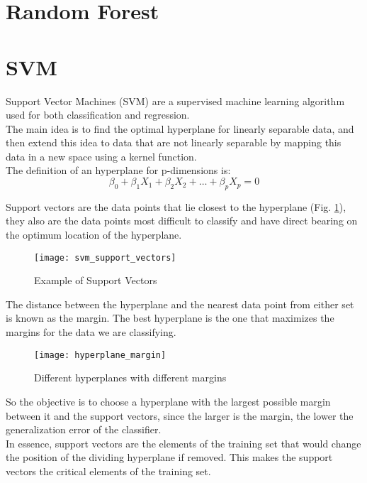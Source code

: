 \pagebreak

\section{Random Forest}

\section{SVM} \label{svm}
Support Vector Machines (SVM) are a supervised machine learning algorithm used for both classification and regression. \\
The main idea is to find the optimal hyperplane for linearly separable data, and then extend this idea to data that are not linearly separable by mapping this data in a new space using a kernel function.\\
The definition of an hyperplane for p-dimensions is:
\begin{equation}
\beta_0 + \beta_1 X_1 + \beta_2 X_2 + \dots + \beta_p X_p = 0
\end{equation}

Support vectors are the data points that lie closest to the hyperplane (Fig. \ref{fig:suppvec}), they also are the data points most difficult to classify and have direct bearing on the optimum location of the hyperplane.\\
\begin{figure}[h]
	\centering
	\texttt{[image: svm\_support\_vectors]}
	\caption{Example of Support Vectors}
	\label{fig:suppvec}
\end{figure}

The distance between the hyperplane and the nearest data point from either set is known as the margin. The best hyperplane is the one that maximizes the margins for the data we are classifying.\\
\begin{figure}[H]
	\centering
	\texttt{[image: hyperplane\_margin]}
	\caption{Different hyperplanes with different margins \cite{svm_monkeylearn}}
\end{figure}

So the objective is to choose a hyperplane with the largest possible margin between it and the support vectors, since the larger is the margin, the lower the generalization error of the classifier.\\
In essence, support vectors are the elements of the training set that would change the position of the dividing hyperplane if removed. This makes the support vectors the critical elements of the training set.\\

